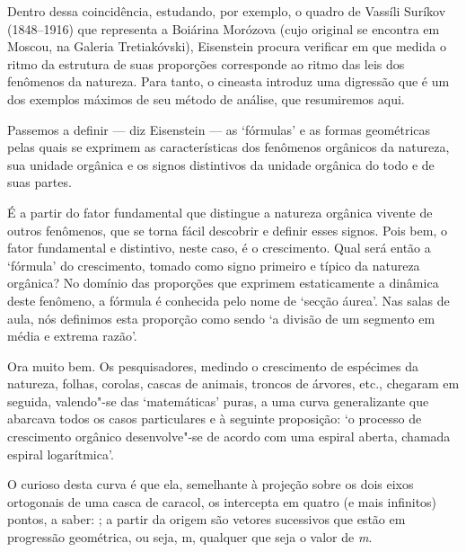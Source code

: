 Dentro dessa coincidência, estudando, por exemplo, o quadro de Vassíli
Suríkov (1848--1916) que representa a Boiárina Morózova (cujo original se
encontra em Moscou, na Galeria Tretiakóvski), Eisenstein procura
verificar em que medida o ritmo da estrutura de suas proporções
corresponde ao ritmo das leis dos fenômenos da natureza. Para tanto, o
cineasta introduz uma digressão que é um dos exemplos máximos de seu
método de análise, que resumiremos aqui.

Passemos a definir --- diz Eisenstein --- as `fórmulas' e as formas
geométricas pelas quais se exprimem as características dos fenômenos
orgânicos da natureza, sua unidade orgânica e os signos distintivos da
unidade orgânica do todo e de suas partes.

É a partir do fator fundamental que distingue a natureza orgânica
vivente de outros fenômenos, que se torna fácil descobrir e definir
esses signos. Pois bem, o fator fundamental e distintivo, neste caso, é
o crescimento. Qual será então a `fórmula' do crescimento, tomado como
signo primeiro e típico da natureza orgânica? No domínio das proporções
que exprimem estaticamente a dinâmica deste fenômeno, a fórmula é
conhecida pelo nome de `secção áurea'. Nas salas de aula, nós definimos
esta proporção como sendo `a divisão de um segmento em média e extrema
razão'.

Ora muito bem. Os pesquisadores, medindo o crescimento de espécimes da
natureza, folhas, corolas, cascas de animais, troncos de árvores, etc.,
chegaram em seguida, valendo"-se das `matemáticas' puras, a uma curva
generalizante que abarcava todos os casos particulares e à seguinte
proposição: `o processo de crescimento orgânico desenvolve"-se de acordo
com uma espiral aberta, chamada espiral logarítmica'.


O curioso desta curva é que ela, semelhante à projeção sobre os dois
eixos ortogonais de uma casca de caracol, os intercepta em quatro (e
mais infinitos) pontos, a saber: ; a partir da origem  são
vetores sucessivos que estão em progressão geométrica, ou seja,
m, qualquer que seja o valor de \emph{m}.

